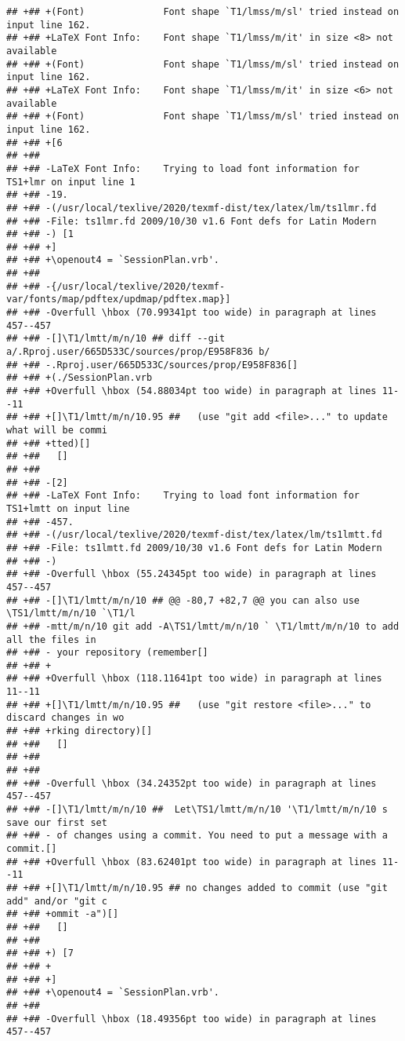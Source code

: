 \documentclass[ignorenonframetext,]{beamer}
\begin{document}
\begin{verbatim}
## +## +(Font)              Font shape `T1/lmss/m/sl' tried instead on input line 162.
## +## +LaTeX Font Info:    Font shape `T1/lmss/m/it' in size <8> not available
## +## +(Font)              Font shape `T1/lmss/m/sl' tried instead on input line 162.
## +## +LaTeX Font Info:    Font shape `T1/lmss/m/it' in size <6> not available
## +## +(Font)              Font shape `T1/lmss/m/sl' tried instead on input line 162.
## +## +[6
## +##  
## +## -LaTeX Font Info:    Trying to load font information for TS1+lmr on input line 1
## +## -19.
## +## -(/usr/local/texlive/2020/texmf-dist/tex/latex/lm/ts1lmr.fd
## +## -File: ts1lmr.fd 2009/10/30 v1.6 Font defs for Latin Modern
## +## -) [1
## +## +]
## +## +\openout4 = `SessionPlan.vrb'.
## +##  
## +## -{/usr/local/texlive/2020/texmf-var/fonts/map/pdftex/updmap/pdftex.map}]
## +## -Overfull \hbox (70.99341pt too wide) in paragraph at lines 457--457
## +## -[]\T1/lmtt/m/n/10 ## diff --git a/.Rproj.user/665D533C/sources/prop/E958F836 b/
## +## -.Rproj.user/665D533C/sources/prop/E958F836[] 
## +## +(./SessionPlan.vrb
## +## +Overfull \hbox (54.88034pt too wide) in paragraph at lines 11--11
## +## +[]\T1/lmtt/m/n/10.95 ##   (use "git add <file>..." to update what will be commi
## +## +tted)[] 
## +##   []
## +##  
## +## -[2]
## +## -LaTeX Font Info:    Trying to load font information for TS1+lmtt on input line 
## +## -457.
## +## -(/usr/local/texlive/2020/texmf-dist/tex/latex/lm/ts1lmtt.fd
## +## -File: ts1lmtt.fd 2009/10/30 v1.6 Font defs for Latin Modern
## +## -)
## +## -Overfull \hbox (55.24345pt too wide) in paragraph at lines 457--457
## +## -[]\T1/lmtt/m/n/10 ## @@ -80,7 +82,7 @@ you can also use \TS1/lmtt/m/n/10 `\T1/l
## +## -mtt/m/n/10 git add -A\TS1/lmtt/m/n/10 ` \T1/lmtt/m/n/10 to add all the files in
## +## - your repository (remember[] 
## +## +
## +## +Overfull \hbox (118.11641pt too wide) in paragraph at lines 11--11
## +## +[]\T1/lmtt/m/n/10.95 ##   (use "git restore <file>..." to discard changes in wo
## +## +rking directory)[] 
## +##   []
## +##  
## +##  
## +## -Overfull \hbox (34.24352pt too wide) in paragraph at lines 457--457
## +## -[]\T1/lmtt/m/n/10 ##  Let\TS1/lmtt/m/n/10 '\T1/lmtt/m/n/10 s save our first set
## +## - of changes using a commit. You need to put a message with a commit.[] 
## +## +Overfull \hbox (83.62401pt too wide) in paragraph at lines 11--11
## +## +[]\T1/lmtt/m/n/10.95 ## no changes added to commit (use "git add" and/or "git c
## +## +ommit -a")[] 
## +##   []
## +##  
## +## +) [7
## +## +
## +## +]
## +## +\openout4 = `SessionPlan.vrb'.
## +##  
## +## -Overfull \hbox (18.49356pt too wide) in paragraph at lines 457--457

\end{verbatim}
\end{document}
